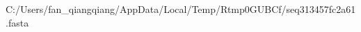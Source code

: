 \documentclass[10pt]{article}
\begin{document}
\begin{texshade}{C:/Users/fan_qiangqiang/AppData/Local/Temp/Rtmp0GUBCf/seq313457fc2a61.fasta}
\hidelogoscale
{}
\end{texshade}
\end{document}
